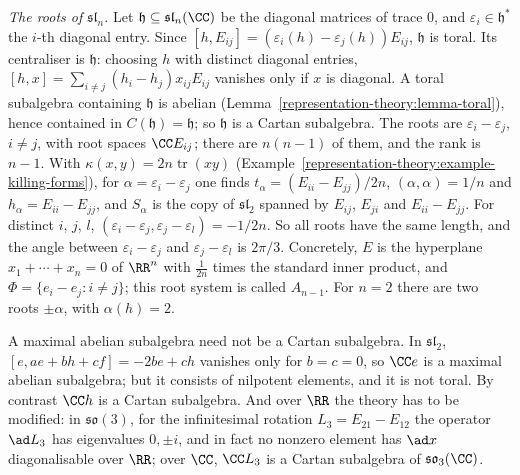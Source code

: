 \begin{example}\label{representation-theory:example-roots-sln}
\emph{The roots of $\mathfrak{sl}_n$.} Let $\mathfrak{h} \subseteq \mathfrak{sl}_n(\CC)$ be the diagonal matrices of trace $0$, and $\varepsilon_i \in \mathfrak{h}^*$ the $i$-th diagonal
entry. Since $[h, E_{ij}] = (\varepsilon_i(h) - \varepsilon_j(h))E_{ij}$, $\mathfrak{h}$ is toral. Its centraliser is $\mathfrak{h}$: choosing $h$ with distinct diagonal entries, $[h, x] =
\sum_{i \neq j}(h_i - h_j)x_{ij}E_{ij}$ vanishes only if $x$ is diagonal. A toral subalgebra containing $\mathfrak{h}$ is abelian (Lemma~\ref{representation-theory:lemma-toral}), hence
contained in $C(\mathfrak{h}) = \mathfrak{h}$; so $\mathfrak{h}$ is a Cartan subalgebra. The roots are $\varepsilon_i - \varepsilon_j$, $i \neq j$, with root spaces $\CC E_{ij}$; there are
$n(n - 1)$ of them, and the rank is $n - 1$. With $\kappa(x, y) = 2n\operatorname{tr}(xy)$ (Example~\ref{representation-theory:example-killing-forms}), for $\alpha = \varepsilon_i -
\varepsilon_j$ one finds $t_\alpha = (E_{ii} - E_{jj})/2n$, $(\alpha, \alpha) = 1/n$ and $h_\alpha = E_{ii} - E_{jj}$, and $S_\alpha$ is the copy of $\mathfrak{sl}_2$ spanned by
$E_{ij}$, $E_{ji}$ and $E_{ii} - E_{jj}$. For distinct $i$, $j$, $l$, $(\varepsilon_i - \varepsilon_j, \varepsilon_j - \varepsilon_l) = -1/2n$. So all roots have the same length, and
the angle between $\varepsilon_i - \varepsilon_j$ and $\varepsilon_j - \varepsilon_l$ is $2\pi/3$. Concretely, $E$ is the hyperplane $x_1 + \cdots + x_n = 0$ of $\RR^n$ with $\frac1{2n}$
times the standard inner product, and $\Phi = \{e_i - e_j : i \neq j\}$; this root system is called $A_{n-1}$. For $n = 2$ there are two roots $\pm\alpha$, with $\alpha(h) = 2$.
\end{example}

\begin{counterexample}\label{representation-theory:counterexample-maximal-abelian}
A maximal abelian subalgebra need not be a Cartan subalgebra. In $\mathfrak{sl}_2$, $[e, ae + bh + cf] = -2be + ch$ vanishes only for $b = c = 0$, so $\CC e$ is a maximal abelian
subalgebra; but it consists of nilpotent elements, and it is not toral. By contrast $\CC h$ is a Cartan subalgebra. And over $\RR$ the theory has to be modified: in
$\mathfrak{so}(3)$, for the infinitesimal rotation $L_3 = E_{21} - E_{12}$ the operator $\ad L_3$ has eigenvalues $0, \pm i$, and in fact no nonzero element has $\ad x$ diagonalisable
over $\RR$; over $\CC$, $\CC L_3$ is a Cartan subalgebra of $\mathfrak{so}_3(\CC)$.
\end{counterexample}

